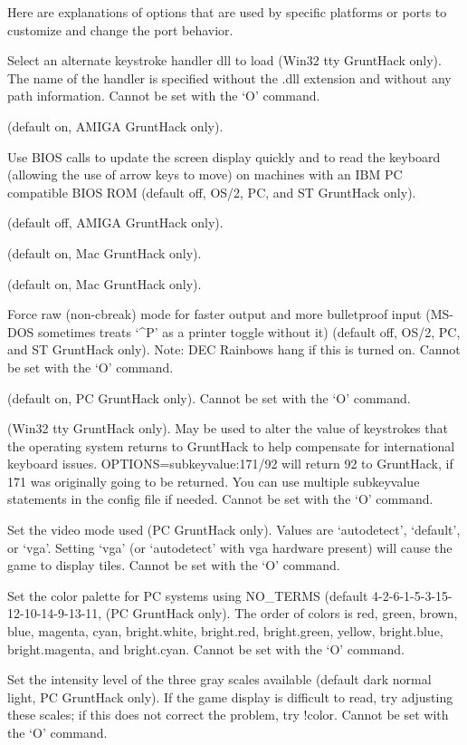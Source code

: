 Here are explanations of options that are used by specific platforms or ports 
to customize and change the port behavior.
\blist{}
\item[\tb{altkeyhandler}]
Select an alternate keystroke handler dll to load (Win32 tty GruntHack only).
The name of the handler is specified without the .dll extension and without any
path information.
Cannot be set with the `O' command.
\item[\tb{altmeta}]
(default on, AMIGA GruntHack only).
\item[\tb{"BIOS    "}]
Use BIOS calls to update the screen
display quickly and to read the keyboard (allowing the use of arrow
keys to move) on machines with an IBM PC compatible BIOS ROM (default off,
OS/2, PC, and ST GruntHack only).
\item[\tb{flush}]
(default off, AMIGA GruntHack only).
\item[\tb{"MACgraphics"}]
(default on, Mac GruntHack only).
\item[\tb{page\_wait}]
(default on, Mac GruntHack only).
\item[\tb{"rawio   "}]
Force raw (non-cbreak) mode for faster output and more
bulletproof input (MS-DOS sometimes treats `\^{}P' as a printer toggle
without it) (default off, OS/2, PC, and ST GruntHack only).
Note:  DEC Rainbows hang if this is turned on.
Cannot be set with the `O' command.
\item[\tb{soundcard}]
(default on, PC GruntHack only).
Cannot be set with the `O' command.
\item[\tb{subkeyvalue}]
(Win32 tty GruntHack only).
May be used to alter the value of keystrokes that the operating system
returns to GruntHack to help compensate for international keyboard issues.
OPTIONS=subkeyvalue:171/92
will return 92 to GruntHack, if 171 was originally going to be returned.
You can use multiple subkeyvalue statements in the config file if needed.
Cannot be set with the `O' command.
\item[\tb{video}]
Set the video mode used (PC GruntHack only).
Values are `autodetect', `default', or `vga'.
Setting `vga' (or `autodetect' with vga hardware present) will cause
the game to display tiles. 
Cannot be set with the `O' command.
\item[\tb{videocolors}]
Set the color palette for PC systems using NO\_TERMS
(default 4-2-6-1-5-3-15-12-10-14-9-13-11, (PC GruntHack only).
The order of colors is red, green, brown, blue, magenta, cyan,
bright.white, bright.red, bright.green, yellow, bright.blue,
bright.magenta, and bright.cyan.
Cannot be set with the `O' command.
\item[\tb{videoshades}]
Set the intensity level of the three gray scales available
(default dark normal light, PC GruntHack only).
If the game display is difficult to read, try adjusting these scales;
if this does not correct the problem, try !color.
Cannot be set with the `O' command.
\elist
